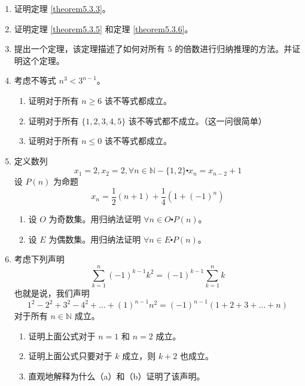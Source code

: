 \begin{enumerate}[label=(\arabic*)]
    \item 证明定理 \ref{theorem5.3.3}。 \label{exc:exercises5.3.1}
    \item 证明定理 \ref{theorem5.3.5} 和定理 \ref{theorem5.3.6}。 \label{exc:exercises5.3.2}
    \item 提出一个定理，该定理描述了如何对所有 $5$ 的倍数进行归纳推理的方法。并证明这个定理。
    \item 考虑不等式 $n^3 < 3^{n-1}$。
        \begin{enumerate}[label=(\alph*)]
            \item 证明对于所有 $n \ge 6$ 该不等式都成立。
            \item 证明对于所有 $\{1,2,3,4,5\}$ 该不等式都不成立。（这一问很简单）
            \item 证明对于所有 $n \le 0$ 该不等式都成立。
        \end{enumerate}
    \item 定义数列
        \[x_1 = 2, x_2 = 2, \forall n \in \mathbb{N} - \{1, 2\} \centerdot x_n = x_{n-2} + 1\]
        设 $P(n)$ 为命题
        \[x_n = \frac{1}{2}(n+1)+\frac{1}{4}(1+(-1)^n)\]
        \begin{enumerate}[label=(\alph*)]
            \item 设 $O$ 为奇数集。用归纳法证明 $\forall n \in O \centerdot P(n)$。
            \item 设 $E$ 为偶数集。用归纳法证明 $\forall n \in E \centerdot P(n)$。
        \end{enumerate}
    \item 考虑下列声明
        \[\sum_{k=1}^{n} (-1)^{k-1}k^2 = (-1)^{k-1}\sum_{k=1}^{n} k\]
        也就是说，我们声明
        \[1^2 - 2^2 + 3^2 - 4^2 + \dots + (1)^{n-1}n^2 = (-1)^{n-1}(1 + 2 + 3 + \dots + n)\]
        对于所有 $n \in \mathbb{N}$ 成立。
        \begin{enumerate}[label=(\alph*)]
            \item 证明上面公式对于 $n=1$ 和 $n=2$ 成立。
            \item 证明上面公式只要对于 $k$ 成立，则 $k+2$ 也成立。
            \item 直观地解释为什么（a）和（b）证明了该声明。
        \end{enumerate}
\end{enumerate}

